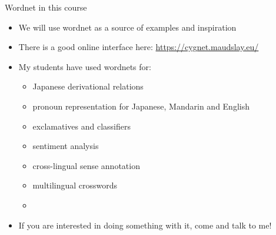 \begin{frame}{Wordnet in this course}

\begin{itemize}
\item We will use wordnet as a source of examples and inspiration
  
\item There is a good online interface here: \url{https://cygnet.maudslay.eu/}
  
\item  My students have used wordnets for:
  \begin{itemize}
  \item  Japanese derivational
relations \citep{Bond:Wei:2019}
\item  pronoun representation for Japanese, Mandarin and English
  \citep{Seah:Bond:2014}
\item exclamatives and classifiers
\citep{Mok:Gao:Bond:2012,daCosta:Bond:2016}
\item  sentiment analysis
  \citep{Le:Moeljadi:Miura:Ohkuma:2016,Bond:Janz:Piasecki:2019}
\item cross-lingual sense annotation \citep{Bonansinga:Bond:2016}
\item multilingual crosswords \citep{Tan:2012}
\item [\ldots]
\end{itemize}
\item If you are interested in doing something with it, come and talk to me!
\end{itemize}
\end{frame}

